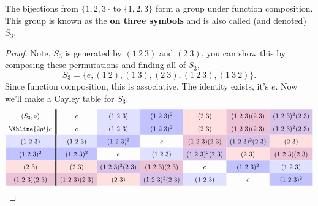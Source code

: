 \documentclass{ximera}
\begin{document}
\begin{example}
  The bijections from $\{1,2,3\}$ to $\{1,2,3\}$ form a group under
  function composition. This group is known as the \textbf{ on three symbols} and is also called (and denoted) $S_3$.
  \begin{proof}
    Note, $S_3$ is generated by $(1\ 2\ 3)$ and $(2\ 3)$, you can show
    this by composing these permutations and finding all of $S_3$,
    \[
    S_3 = \{e,(1\ 2),(1\ 3), (2\ 3), (1 \ 2 \ 3), (1 \ 3 \ 2)\}. 
    \]
    Since function composition, this is associative. The identity
    exists, it's $e$. Now we'll make a Cayley table for $S_3$.
    \begin{gather*}
      \renewcommand{\arraystretch}{1.6}
      \begin{array}{c!{\vline width 2pt}cccccc}
        (S_3,\circ)& e     & (1\ 2\ 3)\cellcolor{blue!12!white}     & (1\ 2\ 3)^2\cellcolor{blue!24!white}   & (2\ 3) \cellcolor{red!12!white}    & (1\ 2\ 3) (2\ 3) \cellcolor{blue!33!red!24!white}  & (1\ 2\ 3)^2 (2\ 3)\cellcolor{blue!66!red!24!white} \\  \Xhline{2pt}
        e          & e     & (1\ 2\ 3)\cellcolor{blue!12!white}    & (1\ 2\ 3)^2\cellcolor{blue!24!white}   & (2\ 3) \cellcolor{red!12!white}    & (1\ 2\ 3) (2\ 3) \cellcolor{blue!33!red!24!white}   & (1\ 2\ 3)^2(2\ 3) \cellcolor{blue!66!red!24!white} \\  
        (1\ 2\ 3)\cellcolor{blue!12!white}         & (1\ 2\ 3)\cellcolor{blue!12!white}    & (1\ 2\ 3)^2\cellcolor{blue!24!white}   & e     & (1\ 2\ 3)(2\ 3)\cellcolor{blue!33!red!24!white} & (1\ 2\ 3)^2(2\ 3) \cellcolor{blue!66!red!24!white}    & (2\ 3) \cellcolor{red!12!white}   \\  
        (1\ 2\ 3)^2\cellcolor{blue!24!white}        & (1\ 2\ 3)^2\cellcolor{blue!24!white}   & e     & (1\ 2\ 3)\cellcolor{blue!12!white}    & (1\ 2\ 3)^2 (2\ 3) \cellcolor{blue!66!red!24!white}   & (2\ 3) \cellcolor{red!12!white} & (1\ 2\ 3)(2\ 3) \cellcolor{blue!33!red!24!white}    \\  
        (2\ 3) \cellcolor{red!12!white}         & (2\ 3) \cellcolor{red!12!white}    & (1\ 2\ 3)^2(2\ 3) \cellcolor{blue!66!red!24!white}   & (1\ 2\ 3) (2\ 3) \cellcolor{blue!33!red!24!white} & e     & (1\ 2\ 3)^2\cellcolor{blue!24!white}    & (1\ 2\ 3)\cellcolor{blue!12!white}   \\  
        (1\ 2\ 3) (2\ 3) \cellcolor{blue!33!red!24!white}        & (1\ 2\ 3)(2\ 3) \cellcolor{blue!33!red!24!white}   & (2\ 3) \cellcolor{red!12!white} & (1\ 2\ 3)^2(2\ 3) \cellcolor{blue!66!red!24!white}    & (1\ 2\ 3)\cellcolor{blue!12!white}   & e     & (1\ 2\ 3)^2\cellcolor{blue!24!white}    \\  

\end{array}
\end{gather*}
\end{proof}
\end{example}
\end{document}

